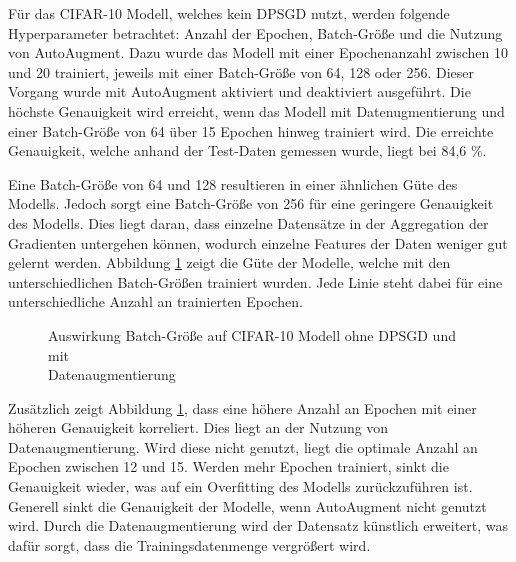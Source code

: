 Für das CIFAR-10 Modell, welches kein DPSGD nutzt, werden folgende Hyperparameter betrachtet: Anzahl der Epochen, Batch-Größe und die Nutzung von AutoAugment.
Dazu wurde das Modell mit einer Epochenanzahl zwischen 10 und 20 trainiert, jeweils mit einer Batch-Größe von 64, 128 oder 256. 
Dieser Vorgang wurde mit AutoAugment aktiviert und deaktiviert ausgeführt.
Die höchste Genauigkeit wird erreicht, wenn das Modell mit Datenugmentierung und einer Batch-Größe von 64 über 15 Epochen hinweg trainiert wird.
Die erreichte Genauigkeit, welche anhand der Test-Daten gemessen wurde, liegt bei 84,6 \%.

Eine Batch-Größe von 64 und 128 resultieren in einer ähnlichen Güte des Modells. 
Jedoch sorgt eine Batch-Größe von 256 für eine geringere Genauigkeit des Modells. 
Dies liegt daran, dass einzelne Datensätze in der Aggregation der Gradienten untergehen können, wodurch einzelne Features der Daten weniger gut gelernt werden. 
Abbildung \ref{fig:cifar-1} zeigt die Güte der Modelle, welche mit den unterschiedlichen Batch-Größen trainiert wurden.
Jede Linie steht dabei für eine unterschiedliche Anzahl an trainierten Epochen.
\begin{figure}[!htb]
    \centering
    \caption{Auswirkung Batch-Größe auf CIFAR-10 Modell ohne DPSGD und mit \\Datenaugmentierung}
    \label{fig:cifar-1}
\end{figure} 

Zusätzlich zeigt Abbildung \ref{fig:cifar-1}, dass eine höhere Anzahl an Epochen mit einer höheren Genauigkeit korreliert.
Dies liegt an der Nutzung von Datenaugmentierung. 
Wird diese nicht genutzt, liegt die optimale Anzahl an Epochen zwischen 12 und 15. 
Werden mehr Epochen trainiert, sinkt die Genauigkeit wieder, was auf ein Overfitting des Modells zurückzuführen ist.
Generell sinkt die Genauigkeit der Modelle, wenn AutoAugment nicht genutzt wird. 
Durch die Datenaugmentierung wird der Datensatz künstlich erweitert, was dafür sorgt, dass die Trainingsdatenmenge vergrößert wird.


